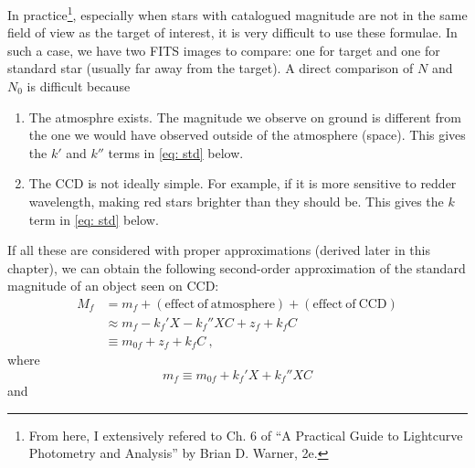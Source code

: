 In practice\footnote{From here, I extensively refered to Ch. 6 of ``A Practical Guide to Lightcurve Photometry and Analysis'' by Brian D. Warner, 2e.}, especially when stars with catalogued magnitude are not in the same field of view as the target of interest, it is very difficult to use these formulae. In such a case, we have two FITS images to compare: one for target and one for standard star (usually far away from the target). A direct comparison of $ N $ and $ N_0 $ is difficult because
\begin{enumerate}
\item The atmosphre exists. The magnitude we observe on ground is different from the one we would have observed outside of the atmosphere (space). This gives the $ k' $ and $ k'' $ terms in \cref{eq: std} below.
\item The CCD is not ideally simple. For example, if it is more sensitive to redder wavelength, making red stars brighter than they should be. This gives the $ k $ term in \cref{eq: std} below.
\end{enumerate}
If all these are considered with proper approximations (derived later in this chapter), we can obtain the following second-order approximation of the standard magnitude of an object seen on CCD:
\begin{equation}\label{eq: std}
\begin{aligned}
  M_f &= m_f + (\mathrm{effect\ of\ atmosphere}) + (\mathrm{effect\ of\ CCD}) \\
    &\approx m_f - k_f' X - k_f''XC + z_f + k_f C \\
    &\equiv m_{0f} + z_f + k_f C ~,
\end{aligned}
\end{equation}
where
\begin{equation}
  m_{f} \equiv m_{0f} + k_f'X + k_f'' XC
\end{equation}
and
